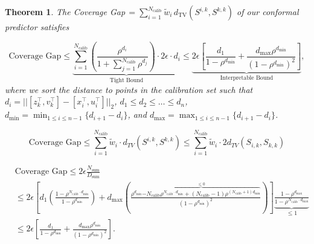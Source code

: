 \documentclass[10pt,a4paper]{amsart}
\newtheorem{theorem}{Theorem}
\newcommand{\T}{^\top}
\newcommand{\tvd}{d_\textrm{TV}}
\begin{document}
\begin{theorem}\label{thm:cov_gap_thm} The \textit{Coverage Gap}$\,=\sum_{i=1}^{N_\textrm{calib}}\tilde{w}_i\,\tvd(S^{i,k}, S^{k,k})$ of our conformal predictor satisfies

\vspace{-10pt}
\begin{equation}\textstyle
    \text{Coverage Gap}\le \underbrace{\textstyle\sum_{i=1}^{N_\textrm{calib}} \left( \frac{\rho^{d_i}}{1 + \sum_{j=1}^{N_\textrm{calib}} \rho^{d_j}} \right) \cdot 2\epsilon \cdot d_i}_{\text{Tight Bound}} \le \underbrace{\textstyle 2 \epsilon \left[  \frac{d_1 }{1 - \rho^{d_\text{min}}} + \frac{d_\text{max}\rho^{d_\text{min}}}{(1-\rho^{d_\text{min}})^2}\right]}_{\text{Interpretable Bound}}, 
\label{eq:thm3_bound}\end{equation}
where we sort the distance to points in the calibration set such that $d_i = ||[z_k\T,v_k\T] - [x_i\T,u_i\T]||_{2}$, $d_1 \le d_2 \le \dots \le d_n$, $d_\text{min} = \min_{1 \leq i \leq n-1}\{d_{i+1} - d_i\}$, and $d_\text{max} = \max_{1 \leq i \leq n-1} \{ d_{i+1} - d_i\}$.
\end{theorem}

\begin{equation}\label{eq:init_barber}
\text{Coverage Gap} \le \sum_{i=1}^{N_\textrm{calib}} \tilde{w}_i \cdot d_{TV}(S^{i,k}, S^{k,k}) \le \sum_{i=1}^{N_\textrm{calib}} \tilde{w}_i \cdot 2 d_{TV}(S_{i,k}, S_{k,k})
\end{equation}

\begin{align}
    &\text{Coverage Gap} \le 2\epsilon\frac{N_\text{sum}}{D_\text{sum}} \\
    &\le 2 \epsilon \left[{d_1 \left( \frac{1 - \rho^{N_\textrm{calib} \cdot d_\text{min}}}{1 - \rho^{d_\text{min}}} \right) +
    d_\text{max} \left( \frac{\rho^{d_\text{min}} \overbrace{- N_\textrm{calib} \rho^{N_\textrm{calib} \cdot d_\text{min}} + (N_\textrm{calib}-1)\rho^{(N_\textrm{calib}+1)d_\text{min}}}^{\leq 0}}{(1-\rho^{d_\text{min}})^2} \right)}\right]\underbrace{\frac{1 - \rho^{d_\text{max}}}{1 - \rho^{N_\textrm{calib} \cdot d_\text{max}}}}_{\leq 1}\label{eq:n_sum_d_sum}\\
    &\le 2 \epsilon \left[  \frac{d_1 }{1 - \rho^{d_\text{min}}} + \frac{d_\text{max}\rho^{d_\text{min}}}{(1-\rho^{d_\text{min}})^2}\right].\label{eq:final_bound} 
\end{align}
\end{document}
